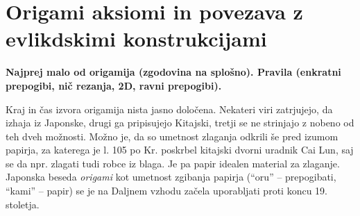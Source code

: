 \section{Origami aksiomi in povezava z evlikdskimi konstrukcijami}

\textbf{Najprej malo od origamija (zgodovina na splošno). Pravila (enkratni prepogibi, nič rezanja, 2D, ravni prepogibi).}

Kraj in čas izvora origamija nista jasno določena. Nekateri viri zatrjujejo, da izhaja iz Japonske, drugi ga pripisujejo Kitajski, tretji se ne strinjajo z nobeno od teh dveh možnosti. Možno je, da so umetnost zlaganja odkrili še pred izumom papirja, za katerega je l. 105 po Kr. poskrbel kitajski dvorni uradnik Cai Lun, saj se da npr. zlagati tudi robce iz blaga. Je pa papir idealen material za zlaganje. Japonska beseda \emph{origami} kot umetnost zgibanja papirja (``oru'' -- prepogibati, ``kami'' -- papir) se je na Daljnem vzhodu začela uporabljati proti koncu 19. stoletja.
